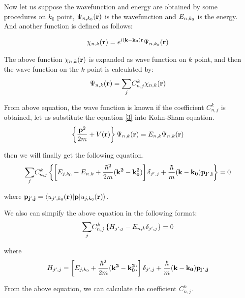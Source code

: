 \documentclass[a4paper]{report}
\begin{document}
Now let us suppose the wavefunction and energy are obtained by some procedures on $k_0$ point, $\wfbloch<n><k_0>$ is the wavefunction and $\ebloch<n><k_0>$ is the energy.
And another function is defined as follows:

\begin{equation}\label{2}
\chikp<n><k> = \expg<(k-k_0)> \wfbloch<n><k_0>
\end{equation}


The above function $\chikp<n><k> $ is expanded as wave function on $k$ point, and then the wave function on the $k$ point is calculated by:
\begin{equation}\label{3}
\wfbloch<n><k> =  {\sum\limits_{j}} C_{n,j}^{k} \chikp<n><k> 
\end{equation}

From above equation, the wave function is known if the coefficient $C_{n,j}^{k}$ is obtained, let us substitute the equation \ref{3} into Kohn-Sham equation.
\begin{equation}\label{4}
\left\{ \frac {{\bf p}^2} {2m} + V({\bf r}) \right\} \wfbloch<n><k> = \ebloch<n><k> \wfbloch<n><k>
\end{equation} 

then we will finally get the following equation.
\begin{equation}\label{5}
{\sum\limits_{j}}  C_{n,j}^{k} \left \{  \left [  \ebloch<j><k_0> -  \ebloch<n><k>  + \frac{{\hbar}^2}{2m} {\bf (k^2-k_0^2)}    \right ] \delta_{j',j} + \frac{\hbar}{m} {\bf(k-k_0)} {\bf p_{j',j}} \right \} = 0
\end{equation}

where ${\bf p_{j',j}} = \langle \ubloch<j'><k_0>| {\bf p} | \ubloch<j><k_0>  \rangle $.
 
We also can simpify the above equation in the following format:
\begin{equation}\label{6}
{\sum\limits_{j}} C_{n,j}^{k} \left \{ H_{j',j}- \ebloch<n><k> \delta_{j',j} \right \} =0
\end{equation}

where
\begin{equation} \label{7}
H_{j',j} = \left [  \ebloch<j><k_0>  + \frac{{\hbar}^2}{2m} {\bf (k^2-k_0^2)}    \right ] \delta_{j',j} + \frac{\hbar}{m} {\bf(k-k_0)} {\bf p_{j',j}}
\end{equation}

From the above equation, we can calculate the coefficient $ C_{n,j}^{k}$.
\end{document}
